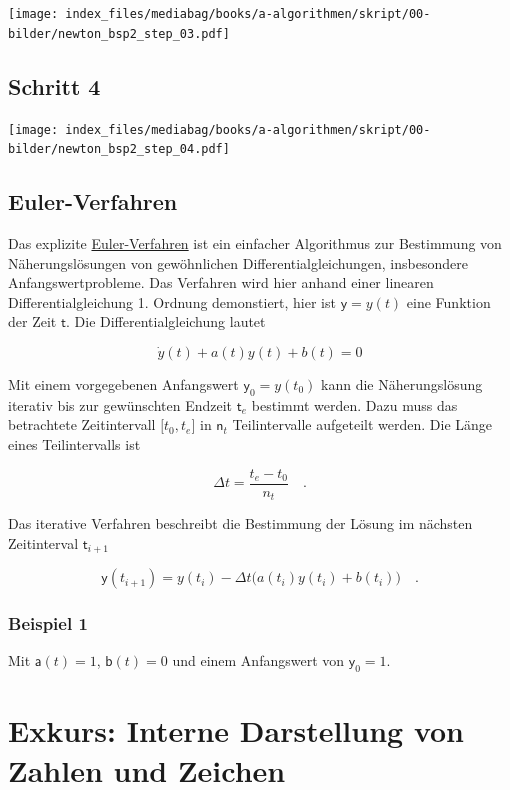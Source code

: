 \documentclass[
  letterpaper,
  DIV=11,
  numbers=noendperiod]{scrreprt}
\begin{document}
\texttt{[image: index\_files/mediabag/books/a-algorithmen/skript/00-bilder/newton\_bsp2\_step\_03.pdf]}

\section{Schritt 4}

\texttt{[image: index\_files/mediabag/books/a-algorithmen/skript/00-bilder/newton\_bsp2\_step\_04.pdf]}

\section{Euler-Verfahren}\label{euler-verfahren}

Das explizite
\href{https://de.wikipedia.org/wiki/Explizites_Euler-Verfahren}{Euler-Verfahren}
ist ein einfacher Algorithmus zur Bestimmung von Näherungslösungen von
gewöhnlichen Differentialgleichungen, insbesondere Anfangswertprobleme.
Das Verfahren wird hier anhand einer linearen Differentialgleichung 1.
Ordnung demonstiert, hier ist \(\mathsf y = y(t)\) eine Funktion der
Zeit \(\mathsf t\). Die Differentialgleichung lautet

\[\dot y(t) + a(t)y(t) + b(t) = 0\]

Mit einem vorgegebenen Anfangswert \(\mathsf y_0 = y(t_0)\) kann die
Näherungslösung iterativ bis zur gewünschten Endzeit \(\mathsf t_e\)
bestimmt werden. Dazu muss das betrachtete Zeitintervall
\(\mathsf[t_0, t_e]\) in \(\mathsf n_t\) Teilintervalle aufgeteilt
werden. Die Länge eines Teilintervalls ist

\[\mathsf \Delta t = \frac{t_e - t_0}{n_t}\quad .\]

Das iterative Verfahren beschreibt die Bestimmung der Lösung im nächsten
Zeitinterval \(\mathsf t_{i+1}\)

\[\mathsf  y(t_{i+1}) = y(t_i) - \Delta t \big(a(t_i)y(t_i) + b(t_i)\big)\quad .\]

\subsection{Beispiel 1}\label{beispiel-1-1}

Mit \(\mathsf a(t) = 1\), \(\mathsf b(t) = 0\) und einem Anfangswert von
\(\mathsf y_0 = 1\).

\chapter{Exkurs: Interne Darstellung von Zahlen und
Zeichen}\label{exkurs-interne-darstellung-von-zahlen-und-zeichen}
\end{document}
